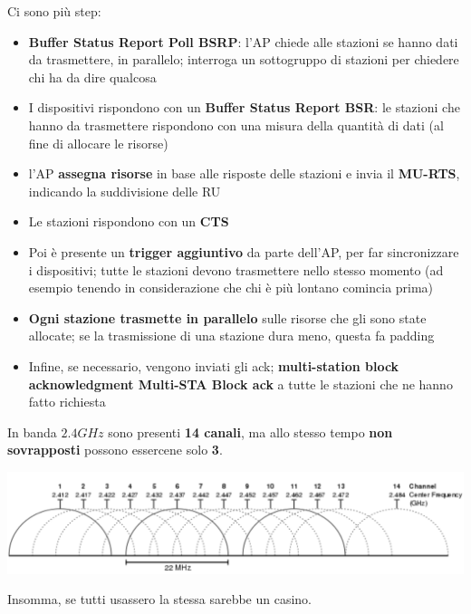 Ci sono più step:
\begin{itemize}
	\item \textbf{Buffer Status Report Poll BSRP}: l'AP chiede alle stazioni se hanno dati da trasmettere, in parallelo; interroga un sottogruppo di stazioni per chiedere chi ha da dire qualcosa
    
	\item I dispositivi rispondono con un \textbf{Buffer Status Report BSR}: le stazioni che hanno da trasmettere rispondono con una misura della quantità di dati (al fine di allocare le risorse)
	
    \item l'AP \textbf{assegna risorse} in base alle risposte delle stazioni e invia il \textbf{MU-RTS}, indicando la suddivisione delle RU
	
    \item Le stazioni rispondono con un \textbf{CTS}
	
    \item Poi è presente un \textbf{trigger aggiuntivo} da parte dell'AP, per far sincronizzare i dispositivi; tutte le stazioni devono trasmettere nello stesso momento (ad esempio tenendo in considerazione che chi è più lontano comincia prima)
	
    \item \textbf{Ogni stazione trasmette in parallelo} sulle risorse che gli sono state allocate; se la trasmissione di una stazione dura meno, questa fa padding
	
    \item Infine, se necessario, vengono inviati gli ack; \textbf{multi-station block acknowledgment Multi-STA Block ack} a tutte le stazioni che ne hanno fatto richiesta
\end{itemize}


In banda $2.4GHz$ sono presenti \textbf{14 canali}, ma allo stesso tempo \textbf{non sovrapposti} possono essercene solo \textbf{3}.

\begin{center}
	\includegraphics[width=0.99\linewidth]{img/wlan/24bande}
\end{center}
Insomma, se tutti usassero la stessa sarebbe un casino.

